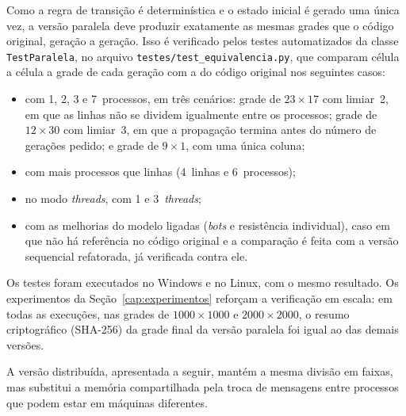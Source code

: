 Como a regra de transição é determinística e o estado inicial é gerado uma única vez, a versão paralela deve produzir exatamente as mesmas grades que o código original, geração a geração. Isso é verificado pelos testes automatizados da classe \texttt{TestParalela}, no arquivo \texttt{testes/test\_equivalencia.py}, que comparam célula a célula a grade de cada geração com a do código original nos seguintes casos:

\begin{itemize}
    \item com 1, 2, 3 e 7~processos, em três cenários: grade de $23 \times 17$ com limiar~2, em que as linhas não se dividem igualmente entre os processos; grade de $12 \times 30$ com limiar~3, em que a propagação termina antes do número de gerações pedido; e grade de $9 \times 1$, com uma única coluna;
    \item com mais processos que linhas (4~linhas e 6~processos);
    \item no modo \textit{threads}, com 1 e 3~\textit{threads};
    \item com as melhorias do modelo ligadas (\textit{bots} e resistência individual), caso em que não há referência no código original e a comparação é feita com a versão sequencial refatorada, já verificada contra ele.
\end{itemize}

Os testes foram executados no Windows e no Linux, com o mesmo resultado. Os experimentos da Seção~\ref{cap:experimentos} reforçam a verificação em escala: em todas as execuções, nas grades de $1000 \times 1000$ e $2000 \times 2000$, o resumo criptográfico (SHA-256) da grade final da versão paralela foi igual ao das demais versões.

A versão distribuída, apresentada a seguir, mantém a mesma divisão em faixas, mas substitui a memória compartilhada pela troca de mensagens entre processos que podem estar em máquinas diferentes.
